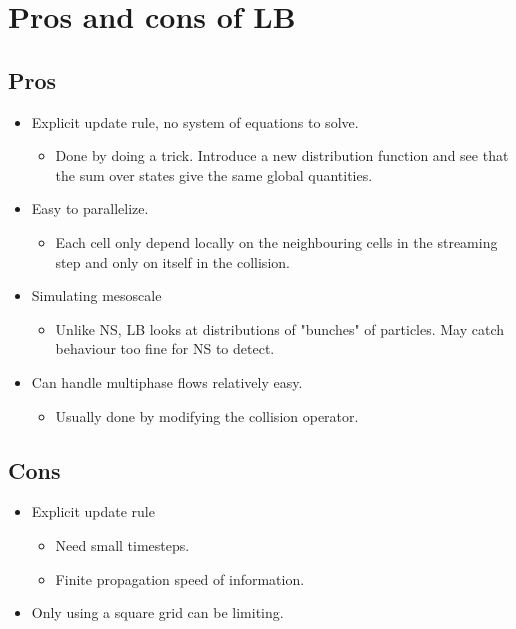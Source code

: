 

\section{Pros and cons of LB}

\subsection{Pros}
\begin{itemize}
    \item Explicit update rule, no system of equations to solve.
    \begin{itemize}
        \item Done by doing a trick. Introduce a new distribution function 
              and see that the sum over states give the same global quantities.
    \end{itemize}

    \item Easy to parallelize.
        \begin{itemize}
            \item Each cell only depend locally on the neighbouring cells in
                  the streaming step and only on itself in the collision.
        \end{itemize}

    \item Simulating mesoscale
        \begin{itemize}
            \item Unlike NS, LB looks at distributions of "bunches" of
                  particles. May catch behaviour too fine for NS to detect.
        \end{itemize}
    \item Can handle multiphase flows relatively easy.
        \begin{itemize}
            \item Usually done by modifying the collision operator.
        \end{itemize}

\end{itemize}

\subsection{Cons}
\begin{itemize}
    \item Explicit update rule
        \begin{itemize}
            \item Need small timesteps.
            \item Finite propagation speed of information.
        \end{itemize}

    \item Only using a square grid can be limiting.
    

        
        
        

\end{itemize}
